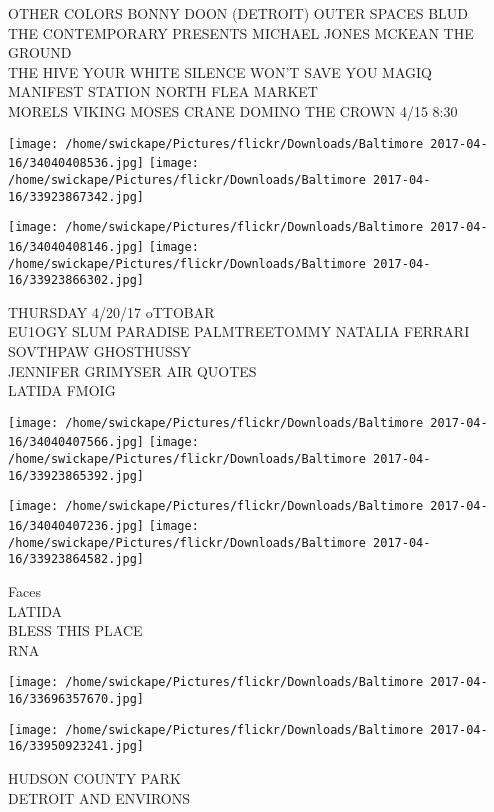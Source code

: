 \documentclass[10pt,letterpaper]{article}
\begin{document}
OTHER COLORS BONNY DOON (DETROIT) OUTER SPACES BLUD\\
THE CONTEMPORARY PRESENTS MICHAEL JONES MCKEAN THE GROUND\\
THE HIVE YOUR WHITE SILENCE WON'T SAVE YOU MAGIQ MANIFEST STATION NORTH FLEA MARKET\\
MORELS VIKING MOSES CRANE DOMINO THE CROWN 4/15 8:30\\
\pagebreak

\texttt{[image: /home/swickape/Pictures/flickr/Downloads/Baltimore 2017-04-16/34040408536.jpg]}
\texttt{[image: /home/swickape/Pictures/flickr/Downloads/Baltimore 2017-04-16/33923867342.jpg]}

\texttt{[image: /home/swickape/Pictures/flickr/Downloads/Baltimore 2017-04-16/34040408146.jpg]}
\texttt{[image: /home/swickape/Pictures/flickr/Downloads/Baltimore 2017-04-16/33923866302.jpg]}

THURSDAY 4/20/17 oTTOBAR\\
EU1OGY SLUM PARADISE PALMTREETOMMY NATALIA FERRARI SOVTHPAW GHOSTHUSSY\\
JENNIFER GRIMYSER AIR QUOTES\\
LATIDA FMOIG\\
\pagebreak

\texttt{[image: /home/swickape/Pictures/flickr/Downloads/Baltimore 2017-04-16/34040407566.jpg]}
\texttt{[image: /home/swickape/Pictures/flickr/Downloads/Baltimore 2017-04-16/33923865392.jpg]}

\texttt{[image: /home/swickape/Pictures/flickr/Downloads/Baltimore 2017-04-16/34040407236.jpg]}
\texttt{[image: /home/swickape/Pictures/flickr/Downloads/Baltimore 2017-04-16/33923864582.jpg]}

Faces\\
LATIDA\\
BLESS THIS PLACE\\
RNA\\
\pagebreak

\texttt{[image: /home/swickape/Pictures/flickr/Downloads/Baltimore 2017-04-16/33696357670.jpg]}

\vspace{0.25in}
\texttt{[image: /home/swickape/Pictures/flickr/Downloads/Baltimore 2017-04-16/33950923241.jpg]}

HUDSON COUNTY PARK\\
DETROIT AND ENVIRONS\\
\pagebreak
\end{document}
